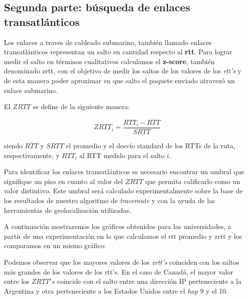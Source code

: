 \subsection{Segunda parte: búsqueda de enlaces transatlánticos}

Los enlaces a traves de cableado submarino, también llamado enlaces transatlánticos representan un salto en cantidad respecto al \textbf{rtt}. Para lograr medir el salto en términos cualitativos calculamos el \textbf{z-score}, también denominado zrtt, con el objetivo de medir los saltos de los valores de los \textit{rtt's} y de esta manera poder aproximar en que salto el paquete enviado atravezó un enlace submarino.

El $ZRTT$ se define de la siguiente manera:

\begin{equation}
 ZRTT_i = \frac{RTT_i - \overline{RTT}}{SRTT}
\end{equation}

siendo $\overline{RTT}$ y $SRTT$ el promedio y el desv\'io standard de los RTTs de la ruta, respectivamente, y $RTT_i$ al RTT medido para el salto $i$.

Para identificar los enlaces transatlánticos es necesario encontrar un umbral que signifique un piso en cuanto al valor del $ZRTT$ que permita calificarlo como un valor distintivo. Este umbral será calculado experimentalmente sobre la base de los resultados de nuestro algoritmo de \textit{traceroute} y con la ayuda de las herramientas de geolocalización utilizadas.

A continuaci\'on mostraremos los gr\'aficos obtenidos para las universidades, a partir de una experimentaci\'on en la que calculamos el rtt promedio y zrtt y los comparamos en un mismo gr\'afico:


Podemos observar que los mayores valores de los \textit{zrtt's} coinciden con los saltos más grandes de los valores de los rtt's. En el caso de Canadá, el mayor valor entre los $ZRTT's$ coincide con el salto entre una dirección IP perteneciente a la Argentina y otra perteneciente a los Estados Unidos entre el \textit{hop} 9 y el 10.

